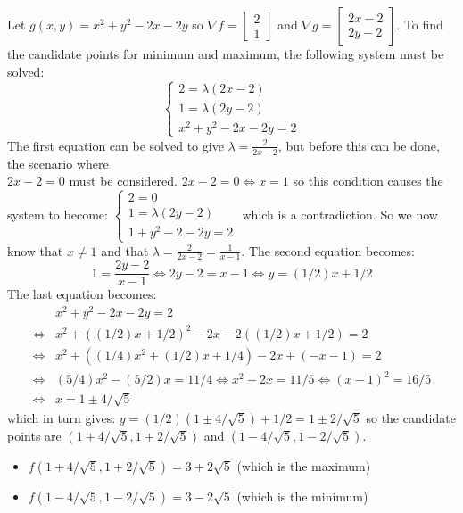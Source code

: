 \documentclass{article}
\newcommand{\dr}[1]{\textcolor{dark_red}{#1}}
\begin{document}
\dr{Let \(g(x,y) = x^2 + y^2 - 2x - 2y\) so \(\nabla f = \begin{bmatrix} 2 \\ 1 \end{bmatrix}\) and \(\nabla g = \begin{bmatrix} 2x - 2 \\ 2y - 2 \end{bmatrix}\). To find the candidate points for minimum and maximum, the following system must be solved: 
\[\left\{\begin{array}{c} 2 = \lambda(2x - 2) \\ 1 = \lambda(2y - 2) \\ x^2 + y^2 - 2x - 2y = 2 \end{array}\right.\]
The first equation can be solved to give \(\lambda = \frac{2}{2x - 2}\), but before this can be done, the scenario where \\ \(2x - 2 = 0\) must be considered. \(2x - 2 = 0 \iff x = 1\) so this condition causes the system to become: 
\(\left\{\begin{array}{c} 2 = 0 \\ 1 = \lambda(2y - 2) \\ 1 + y^2 - 2 - 2y = 2 \end{array}\right.\)
which is a contradiction. So we now know that \(x \neq 1\) and that \(\lambda = \frac{2}{2x - 2} = \frac{1}{x - 1}\). The second equation becomes:
\[1 = \frac{2y - 2}{x - 1} \iff 2y - 2 = x - 1 \iff y = (1/2)x + 1/2\]
The last equation becomes:
\begin{align*}
& x^2 + y^2 - 2x - 2y = 2 \\
\iff & x^2 + ((1/2)x + 1/2)^2 - 2x - 2((1/2)x + 1/2) = 2 \\
\iff & x^2 + ((1/4)x^2 + (1/2)x + 1/4) - 2x + (-x - 1) = 2 \\
\iff & (5/4)x^2 - (5/2)x = 11/4 
\iff x^2 - 2x = 11/5 
\iff (x - 1)^2 = 16/5 \\
\iff & x = 1 \pm 4/\sqrt{5}
\end{align*}
which in turn gives: \(y = (1/2)(1 \pm 4/\sqrt{5}) + 1/2 = 1 \pm 2/\sqrt{5}\) so the candidate points are \((1 + 4/\sqrt{5}, 1 + 2/\sqrt{5})\) and \((1 - 4/\sqrt{5}, 1 - 2/\sqrt{5})\). 
\begin{itemize}
\item \(f(1 + 4/\sqrt{5}, 1 + 2/\sqrt{5}) = 3 + 2\sqrt{5}\) (which is the maximum)
\item \(f(1 - 4/\sqrt{5}, 1 - 2/\sqrt{5}) = 3 - 2\sqrt{5}\) (which is the minimum)
\end{itemize}
}
\end{document}
